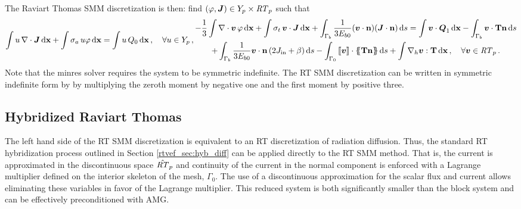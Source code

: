 \documentclass[../doc.tex]{subfiles}
\begin{document}
The Raviart Thomas SMM discretization is then: find $(\varphi,\boldsymbol{J}) \in Y_p \times \mathit{RT}_p$ such that 
	\begin{subequations}
	\begin{equation}
		\int u\,\nabla\cdot\vec{J} \ud \x + \int \sigma_a\, u \varphi \ud \x = \int u\, Q_0 \ud \x \,, \quad \forall u \in Y_p \,, 
	\end{equation}\vspace{-.75cm}
	\begin{multline}
		-\frac{1}{3}\int \nabla\cdot\vec{v}\, \varphi \ud \x + \int\sigma_t\, \vec{v}\cdot\vec{J} \ud \x + \int_{\Gamma_b} \frac{1}{3E_{b0}}(\vec{v}\cdot\n)(\vec{J}\cdot\n) \ud s = \int \vec{v}\cdot\Qone \ud \x - \int_{\Gamma_b} \vec{v}\cdot\T\n \ud s \\
		+\int_{\Gamma_b} \frac{1}{3E_{b0}}\vec{v}\cdot\n\paren{2\Jin + \beta} \ud s - \int_{\Gamma_0} \jump{\vec{v}}\cdot\avg{\T\n} \ud s + \int \nablah \vec{v} : \T \ud \x \,, \quad \forall \vec{v} \in \RT_p \,. 
	\end{multline}
	\end{subequations}
Note that the \gls{minres} solver requires the system to be symmetric indefinite. The RT SMM discretization can be written in symmetric indefinite form by by multiplying the zeroth moment by negative one and the first moment by positive three. 

\subsection{Hybridized Raviart Thomas}
The left hand side of the RT SMM discretization is equivalent to an RT discretization of radiation diffusion. Thus, the standard RT hybridization process outlined in Section \ref{rtvef_sec:hyb_diff} can be applied directly to the RT SMM method. That is, the current is approximated in the discontinuous space $\hat{\mathit{RT}}_p$ and continuity of the current in the normal component is enforced with a Lagrange multiplier defined on the interior skeleton of the mesh, $\Gamma_0$. The use of a discontinuous approximation for the scalar flux and current allows eliminating these variables in favor of the Lagrange multiplier. This reduced system is both significantly smaller than the block system and can be effectively preconditioned with AMG. 
\end{document}
